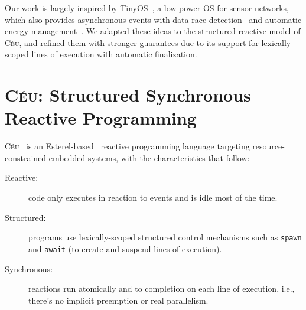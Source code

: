 \documentclass[sigplan,10pt,review,anonymous]{acmart}\settopmatter{printfolios=true,printccs=false,printacmref=false}
\newcommand{\CEU}{\textsc{C\'{e}u}\xspace}
\newcommand{\code}[1] {{\small{\texttt{#1}}}}
\begin{document}
Our work is largely inspired by TinyOS~\cite{wsn.tos}, a low-power OS for
sensor networks, which also provides asynchronous events with %
data race detection~\cite{wsn.nesc} and automatic energy
management~\cite{wsn.icem}.
%
We adapted these ideas to the structured reactive model of \CEU,
and refined them with stronger guarantees due to its support for lexically
scoped lines of execution with automatic finalization.

\section{\CEU: Structured Synchronous Reactive Programming}
\label{sec.ceu}

\CEU~\cite{ceu.sensys13} is an Esterel-based~\cite{esterel.ieee91}
reactive
programming language targeting resource-constrained embedded systems, with the
characteristics that follow:
%
\begin{description}
\item [Reactive:] code only executes in reaction to events and is idle most of
    the time.
\item [Structured:] programs use lexically-scoped structured control
    mechanisms such as \code{spawn} and \code{await} (to create and suspend
    lines of execution).
\item [Synchronous:] reactions run atomically and to completion on each line of
    execution, i.e., there's no implicit preemption or real parallelism.
\end{description}
\end{document}
